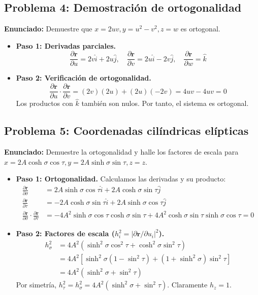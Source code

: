 \documentclass[a4paper]{article}
\begin{document}
\subsection*{Problema 4: Demostración de ortogonalidad}
\textbf{Enunciado:} Demuestre que $x = 2uv, y = u^2 - v^2, z = w$ es ortogonal.

\begin{itemize}
    \item \textbf{Paso 1: Derivadas parciales.}
    \begin{equation}
        \frac{\partial \mathbf{r}}{\partial u} = 2v\hat{i} + 2u\hat{j}, \quad \frac{\partial \mathbf{r}}{\partial v} = 2u\hat{i} - 2v\hat{j}, \quad \frac{\partial \mathbf{r}}{\partial w} = \hat{k}
    \end{equation}
    \item \textbf{Paso 2: Verificación de ortogonalidad.}
    \begin{equation}
        \frac{\partial \mathbf{r}}{\partial u} \cdot \frac{\partial \mathbf{r}}{\partial v} = (2v)(2u) + (2u)(-2v) = 4uv - 4uv = 0
    \end{equation}
    Los productos con $\hat{k}$ también son nulos. Por tanto, el sistema es ortogonal.
\end{itemize}

\subsection*{Problema 5: Coordenadas cilíndricas elípticas}
\textbf{Enunciado:} Demuestre la ortogonalidad y halle los factores de escala para $x = 2A \cosh \sigma \cos \tau, y = 2A \sinh \sigma \sin \tau, z = z$.

\begin{itemize}
    \item \textbf{Paso 1: Ortogonalidad.} Calculamos las derivadas y su producto:
    \begin{align*}
        \frac{\partial \mathbf{r}}{\partial \sigma} &= 2A \sinh \sigma \cos \tau \hat{i} + 2A \cosh \sigma \sin \tau \hat{j} \\
        \frac{\partial \mathbf{r}}{\partial \tau} &= -2A \cosh \sigma \sin \tau \hat{i} + 2A \sinh \sigma \cos \tau \hat{j} \\
        \frac{\partial \mathbf{r}}{\partial \sigma} \cdot \frac{\partial \mathbf{r}}{\partial \tau} &= -4A^2 \sinh \sigma \cos \tau \cosh \sigma \sin \tau + 4A^2 \cosh \sigma \sin \tau \sinh \sigma \cos \tau = 0
    \end{align*}
    \item \textbf{Paso 2: Factores de escala ($h_i^2 = |\partial \mathbf{r}/\partial u_i|^2$).}
    \begin{align*}
        h_\sigma^2 &= 4A^2 (\sinh^2 \sigma \cos^2 \tau + \cosh^2 \sigma \sin^2 \tau) \\
        &= 4A^2 [\sinh^2 \sigma (1-\sin^2 \tau) + (1+\sinh^2 \sigma)\sin^2 \tau] \\
        &= 4A^2 (\sinh^2 \sigma + \sin^2 \tau)
    \end{align*}
    Por simetría, $h_\tau^2 = h_\sigma^2 = 4A^2 (\sinh^2 \sigma + \sin^2 \tau)$. Claramente $h_z = 1$.
\end{itemize}
\end{document}
